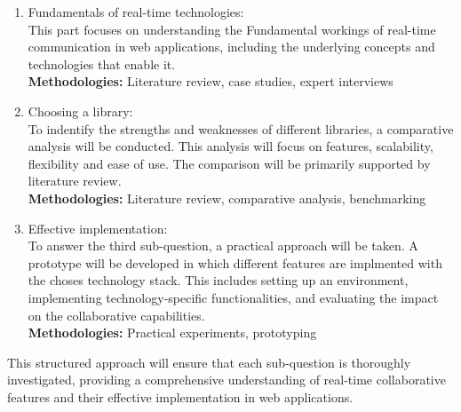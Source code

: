 \begin{enumerate}
    \item Fundamentals of real-time technologies: \\ This part focuses on understanding the Fundamental workings of real-time communication in web applications, including the underlying concepts and technologies that enable it. \\ \textbf{Methodologies:} Literature review, case studies, expert interviews
    \item Choosing a library: \\ To indentify the strengths and weaknesses of different libraries, a comparative analysis will be conducted. This analysis will focus on features, scalability, flexibility and ease of use. The comparison will be primarily supported by literature review. \\ \textbf{Methodologies:} Literature review, comparative analysis, benchmarking
    \item Effective implementation: \\ To answer the third sub-question, a practical approach will be taken. A prototype will be developed in which different features are implmented with the choses technology stack. This includes setting up an environment, implementing technology-specific functionalities, and evaluating the impact on the collaborative capabilities. \\ \textbf{Methodologies:} Practical experiments, prototyping
\end{enumerate}

This structured approach will ensure that each sub-question is thoroughly investigated, providing a comprehensive understanding of real-time collaborative features and their effective implementation in web applications.
